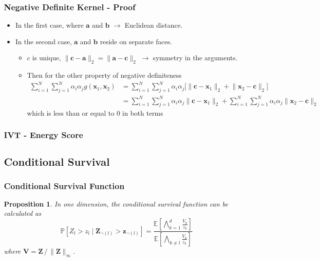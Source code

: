 \documentclass[aspectratio=169,10pt,notes]{beamer}
\newtheorem{prop}{Proposition}
\begin{document}
\begin{frame}
    \frametitle{Negative Definite Kernel - Proof}
    \label{pgpareto:negdefkernel}
    \begin{itemize}
        \item In the first case, where $\bm{a}$ and $\bm{b}$ $\rightarrow$ Euclidean distance. 
        \item In the second case, $\bm{a}$ and $\bm{b}$ reside on separate
  faces.  
  \begin{itemize}
      \item $c$ is unique, $\lVert\bm{c} - \bm{a}\rVert_2 = \lVert\bm{a} - \bm{c}\rVert_2$ $\rightarrow$ symmetry in the arguments.
      \item Then for the other property of negative definiteness
  \begin{equation*}
    \begin{aligned}
      \sum_{i = 1}^N\sum_{j = 1}^N \alpha_i\alpha_j g(\bm{x}_1,\bm{x}_2) 
        &= \sum_{i = 1}^N\sum_{j = 1}^N \alpha_i\alpha_j \bigg[\lVert\bm{c} - \bm{x}_1\rVert_2 
            + \lVert\bm{x}_2 - \bm{c}\rVert_2\bigg]\\
      &= \sum_{i = 1}^N\sum_{j = 1}^N \alpha_i\alpha_j\lVert\bm{c} - \bm{x}_1\rVert_2 +
            \sum_{i = 1}^N\sum_{j = 1}^N \alpha_i\alpha_j\lVert\bm{x}_2 - \bm{c}\rVert_2
    \end{aligned}
  \end{equation*}
  which is less than or equal to $0$ in both terms
  \end{itemize} 
  \end{itemize}
\end{frame}


\begin{frame}
  \frametitle{IVT - Energy Score}
  \begin{center}
    
  \end{center}
\end{frame} %

\subsection*{Conditional Survival}

\begin{frame}
  \frametitle{Conditional Survival Function}
  \begin{prop}
      In one dimension, the conditional survival function can be calculated as
    \[
        \mathbb{P}\left[Z_l > z_l\mid \bm{Z}_{\neg(l)} > \bm{z}_{\neg(l)}\right] =
        \frac{\mathbb{E}\left[\bigwedge_{k = 1}^d \frac{V_k}{z_k}\right]}{
                      \mathbb{E}\left[\bigwedge_{k \neq l}\frac{V_k}{z_k}\right]}
    \]
      where $\bm{V} = \bm{Z}\,/\,\lVert\bm{Z}\rVert_{\infty}$.
  \end{prop}
\end{frame} %
\end{document}
